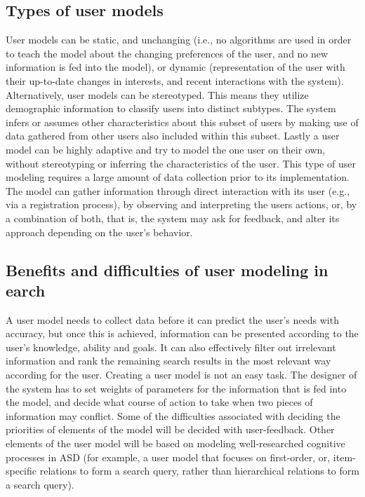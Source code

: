 \documentclass[10pt]{article}
\begin{document}
\subsection{Types of user models}
User models can be static, and unchanging (i.e., no algorithms are used in order to teach the model about the changing preferences of the user, and no new information is fed into the model), or dynamic (representation of the user with their up-to-date changes in interests, and recent interactions with the system). Alternatively, user models can be stereotyped. This means they utilize demographic information to classify users into distinct subtypes. The system infers or assumes other characteristics about this subset of users by making use of data gathered from other users also included within this subset. Lastly a user model can be highly adaptive and try to model the one user on their own, without stereotyping or inferring the characteristics of the user. This type of user modeling requires a large amount of data collection prior to its implementation.
\\The model can gather information through direct interaction with its user (e.g., via a registration process), by observing and interpreting the users actions, or, by a combination of both, that is, the system may ask for feedback, and alter its approach depending on the user’s behavior.

\subsection{Benefits and difficulties of user modeling in earch}
A user model needs to collect data before it can predict the user’s needs with accuracy, but once this is achieved, information can be presented according to the user’s knowledge, ability and goals. It can also effectively filter out irrelevant information and rank the remaining search results in the most relevant way according for the user.
Creating a user model is not an easy task. The designer of the system has to set weights of parameters for the information that is fed into the model, and decide what course of action to take when two pieces of information may conflict. Some of the difficulties associated with deciding the priorities of elements of the model will be decided with user-feedback. Other elements of the user model will be based on modeling well-researched cognitive processes in ASD (for example, a user model that focuses on first-order, or, item-specific relations to form a search query, rather than hierarchical relations to form a search query).  
\end{document}
